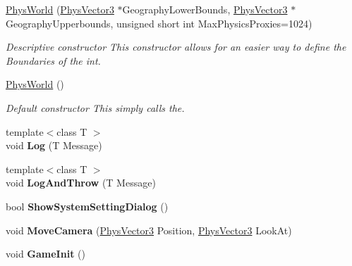 \begin{DoxyCompactItemize}
\item 
\hyperlink{classPhysWorld_a3228c98369082139722d3c918d735e6c}{PhysWorld} (\hyperlink{classPhysVector3}{PhysVector3} $\ast$GeographyLowerBounds, \hyperlink{classPhysVector3}{PhysVector3} $\ast$GeographyUpperbounds, unsigned short int MaxPhysicsProxies=1024)
\begin{DoxyCompactList}\small\item\em Descriptive constructor This constructor allows for an easier way to define the Boundaries of the int. \item\end{DoxyCompactList}\item 
\hypertarget{classPhysWorld_a6ded8026b0cd72e7877830698197adf0}{
\hyperlink{classPhysWorld_a6ded8026b0cd72e7877830698197adf0}{PhysWorld} ()}
\label{db/df5/classPhysWorld_a6ded8026b0cd72e7877830698197adf0}

\begin{DoxyCompactList}\small\item\em Default constructor This simply calls the. \item\end{DoxyCompactList}\item 
\hypertarget{classPhysWorld_a5e9fead1c3100f5dbd5ca985b82b85ea}{
{\footnotesize template$<$class T $>$ }\\void {\bfseries Log} (T Message)}
\label{db/df5/classPhysWorld_a5e9fead1c3100f5dbd5ca985b82b85ea}

\item 
\hypertarget{classPhysWorld_a1c2aeaed2a89821a4545db854da33ab8}{
{\footnotesize template$<$class T $>$ }\\void {\bfseries LogAndThrow} (T Message)}
\label{db/df5/classPhysWorld_a1c2aeaed2a89821a4545db854da33ab8}

\item 
\hypertarget{classPhysWorld_a9b83f04907443c6307956a3c4089e3ca}{
bool {\bfseries ShowSystemSettingDialog} ()}
\label{db/df5/classPhysWorld_a9b83f04907443c6307956a3c4089e3ca}

\item 
\hypertarget{classPhysWorld_a1df24ee06d5881825902b60e0d81174a}{
void {\bfseries MoveCamera} (\hyperlink{classPhysVector3}{PhysVector3} Position, \hyperlink{classPhysVector3}{PhysVector3} LookAt)}
\label{db/df5/classPhysWorld_a1df24ee06d5881825902b60e0d81174a}

\item 
\hypertarget{classPhysWorld_a6d65a7412c1711497fbd1173f879243a}{
void {\bfseries GameInit} ()}
\label{db/df5/classPhysWorld_a6d65a7412c1711497fbd1173f879243a}


\end{DoxyCompactItemize}
